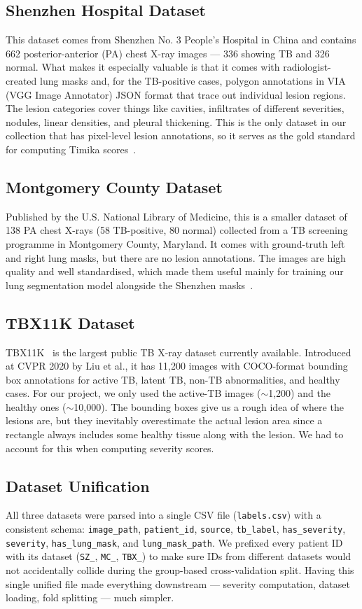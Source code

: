 \documentclass[12pt]{report}
\begin{document}
\subsection{Shenzhen Hospital Dataset}
This dataset comes from Shenzhen No. 3 People's Hospital in China and contains 662 posterior-anterior (PA) chest X-ray images --- 336 showing TB and 326 normal. What makes it especially valuable is that it comes with radiologist-created lung masks and, for the TB-positive cases, polygon annotations in VIA (VGG Image Annotator) JSON format that trace out individual lesion regions. The lesion categories cover things like cavities, infiltrates of different severities, nodules, linear densities, and pleural thickening. This is the only dataset in our collection that has pixel-level lesion annotations, so it serves as the gold standard for computing Timika scores~\cite{ref11}.

\subsection{Montgomery County Dataset}
Published by the U.S. National Library of Medicine, this is a smaller dataset of 138 PA chest X-rays (58 TB-positive, 80 normal) collected from a TB screening programme in Montgomery County, Maryland. It comes with ground-truth left and right lung masks, but there are no lesion annotations. The images are high quality and well standardised, which made them useful mainly for training our lung segmentation model alongside the Shenzhen masks~\cite{ref11}.

\subsection{TBX11K Dataset}
TBX11K~\cite{ref1} is the largest public TB X-ray dataset currently available. Introduced at CVPR 2020 by Liu et al., it has 11,200 images with COCO-format bounding box annotations for active TB, latent TB, non-TB abnormalities, and healthy cases. For our project, we only used the active-TB images ($\sim$1,200) and the healthy ones ($\sim$10,000). The bounding boxes give us a rough idea of where the lesions are, but they inevitably overestimate the actual lesion area since a rectangle always includes some healthy tissue along with the lesion. We had to account for this when computing severity scores.

\subsection{Dataset Unification}
All three datasets were parsed into a single CSV file (\texttt{labels.csv}) with a consistent schema: \texttt{image\_path}, \texttt{patient\_id}, \texttt{source}, \texttt{tb\_label}, \texttt{has\_severity}, \texttt{severity}, \texttt{has\_lung\_mask}, and \texttt{lung\_mask\_path}. We prefixed every patient ID with its dataset (\texttt{SZ\_}, \texttt{MC\_}, \texttt{TBX\_}) to make sure IDs from different datasets would not accidentally collide during the group-based cross-validation split. Having this single unified file made everything downstream --- severity computation, dataset loading, fold splitting --- much simpler.
\end{document}
